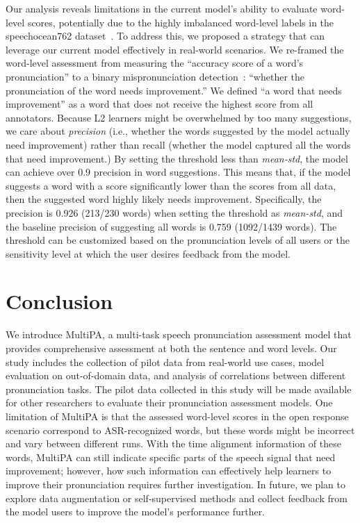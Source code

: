\documentclass{Interspeech2024}
\begin{document}
Our analysis reveals limitations in the current model's ability to evaluate word-level scores, potentially due to the highly imbalanced word-level labels in the speechocean762 dataset~\cite{do2023score}. To address this, we proposed a strategy that can leverage our current model effectively in real-world scenarios. We re-framed the word-level assessment from measuring the “accuracy score of a word's pronunciation” to a binary mispronunciation detection~\cite{ryu2023joint}: “whether the pronunciation of the word needs improvement.” We defined “a word that needs improvement” as a word that does not receive the highest score from all annotators. Because L2 learners might be overwhelmed by too many suggestions, we care about \emph{precision} (i.e., whether the words suggested by the model actually need improvement) rather than recall (whether the model captured all the words that need improvement.) By setting the threshold less than \emph{mean-std}, the model can achieve over 0.9 precision in word suggestions. This means that, if the model suggests a word with a score significantly lower than the scores from all data, then 
the suggested word highly likely needs improvement. Specifically, the precision is 0.926 (213/230 words) when setting the threshold as \emph{mean-std}, and the baseline precision of suggesting all words is 0.759 (1092/1439 words). The threshold can be customized based on the pronunciation levels of all users or the sensitivity level at which the user desires feedback from the model.


\section{Conclusion}
\label{sec:conclusion}
We introduce MultiPA, a multi-task speech pronunciation assessment model that provides comprehensive assessment at both the sentence and word levels. Our study includes the collection of pilot data from real-world use cases, model evaluation on out-of-domain data, and analysis of correlations between different pronunciation tasks. The pilot data collected in this study will be made available for other researchers to evaluate their pronunciation assessment models. One limitation of MultiPA is that the assessed word-level scores in the open response scenario correspond to ASR-recognized words, but these words might be incorrect and vary between different runs. With the time alignment information of these words, MultiPA can still indicate specific parts of the speech signal that need improvement; however, how such information can effectively help learners to improve their pronunciation requires further investigation. In future, we plan to explore data augmentation or self-supervised methods and collect feedback from the model users to improve the model’s performance further.
\end{document}
